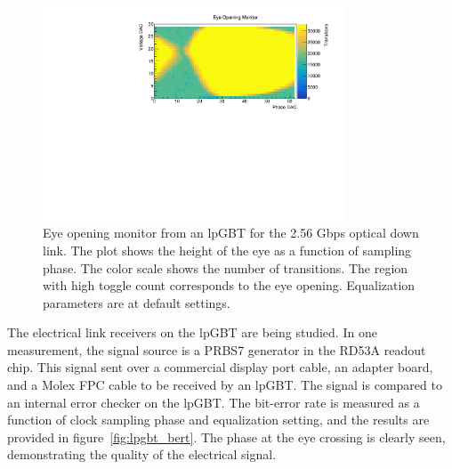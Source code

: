 \documentclass[a4paper,11pt]{article}
\begin{document}

\begin{figure}[htbp]
\centering
\includegraphics[width=0.8\textwidth,origin=c]{../figures/lpGBT_eye.pdf}
\caption{
\label{fig:lpgbt_eye}
Eye opening monitor from an lpGBT for the 2.56 Gbps optical down link.
The plot shows the height of the eye as a function of sampling phase.
The color scale shows the number of transitions.
The region with high toggle count corresponds to the eye opening.
Equalization parameters are at default settings.
}
\end{figure}


The electrical link receivers on the lpGBT are being studied.
In one measurement, the signal source is a PRBS7 generator in the RD53A readout chip.
This signal sent over a commercial display port cable, an adapter board, and a Molex FPC cable to be received by an lpGBT.
The signal is compared to an internal error checker on the lpGBT.
The bit-error rate is measured as a function of clock sampling phase and equalization setting, and the results are provided in figure~\ref{fig:lpgbt_bert}.
The phase at the eye crossing is clearly seen, demonstrating the quality of the electrical signal.

\end{document}
